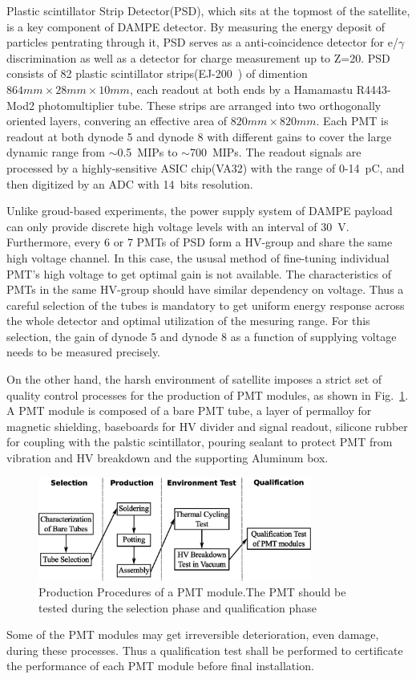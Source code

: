 \documentclass[5p, times]{elsarticle}
\begin{document}
Plastic scintillator Strip Detector(PSD), which sits at the topmost of the satellite, is a key component of DAMPE detector.
By measuring the energy deposit of particles pentrating through it, PSD serves as a anti-coincidence detector for e/$\gamma$ discrimination as well as a detector for charge measurement up to Z=20.
PSD consists of 82 plastic scintillator strips(EJ-200~\cite{ej200}) of dimention $864mm\times28mm\times10mm$, each readout at both ends by a Hamamastu R4443-Mod2 photomultiplier tube.
These strips are arranged into two orthogonally oriented layers, convering an effective area of $820mm\times820mm$.
Each PMT is readout at both dynode 5 and dynode 8 with different gains to cover the large dynamic range from $\sim$0.5~MIPs to $\sim$700~MIPs.
The readout signals are processed by a highly-sensitive ASIC chip(VA32) with the range of 0-14~pC, and then digitized by an ADC with 14~bits resolution.

Unlike groud-based experiments, the power supply system of DAMPE payload can only provide discrete high voltage levels with an interval of 30~V.
Furthermore, every 6 or 7 PMTs of PSD form a HV-group and share the same high voltage channel.
In this case, the ususal method of fine-tuning individual PMT's high voltage to get optimal gain is not available.  
The characteristics of PMTs in the same HV-group should have similar dependency on voltage.
Thus a careful selection of the tubes is mandatory to get uniform energy response across the whole detector and optimal utilization of the mesuring range.
For this selection, the gain of dynode 5 and dynode 8 as a function of supplying voltage needs to be measured precisely.  

On the other hand, the harsh environment of satellite imposes a strict set of quality control processes for the production of PMT modules, as shown in Fig.~\ref{fig:production_procedure}.
A PMT module is composed of a bare PMT tube, a layer of permalloy for magnetic shielding, baseboards for HV divider and signal readout, silicone rubber for coupling with the palstic scintillator, pouring sealant to protect PMT from vibration and HV breakdown and the supporting Aluminum box.
\begin{figure}[h!]
 \centering
 \includegraphics[width=90mm]{pmt_production_procedure}
\caption{Production Procedures of a PMT module.The PMT should be tested during the selection phase and qualification phase}
\label{fig:production_procedure}
\end{figure} 
Some of the PMT modules may get irreversible deterioration, even damage, during these processes.
Thus a qualification test shall be performed to certificate the performance of each PMT module before final installation. 
\end{document}
